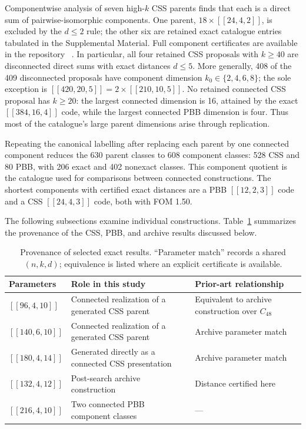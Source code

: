 \documentclass[aps,prx,twocolumn,superscriptaddress,nofootinbib,floatfix]{revtex4-2}
\newcommand{\code}[1]{\ensuremath{\left[\!\left[#1\right]\!\right]}}
\begin{document}
\begingroup
{}
Componentwise analysis of seven high-$k$ CSS parents finds that each is a
direct sum of pairwise-isomorphic components.  One parent,
$18\times\code{24,4,2}$, is excluded by the $d\leq2$ rule; the other six are
retained exact catalogue entries tabulated in the Supplemental Material.  Full
component certificates are available in the repository
~\cite{cruzbenito2026qcode}.  In particular, all
four retained CSS proposals with $k\geq40$ are disconnected direct sums with
exact distances $d\leq5$.  More generally, 408 of the 409 disconnected
proposals have component dimension $k_0\in\{2,4,6,8\}$; the sole exception is
$\code{420,20,5}=2\times\code{210,10,5}$.  No retained connected CSS
proposal has $k\geq20$: the largest connected dimension is 16, attained
by the exact $\code{384,16,4}$ code, while the largest connected PBB dimension
is four.  Thus most of the catalogue's large parent dimensions arise through
replication.
\par
\endgroup

Repeating the canonical labelling after replacing each parent by one
connected component reduces the 630 parent classes to 608 component classes:
528 CSS and 80 PBB, with 206 exact and 402 nonexact classes.  This component
quotient is the catalogue used for comparisons between connected
constructions.  The shortest components with certified exact distances are a
PBB $\code{12,2,3}$ code and a CSS $\code{24,4,3}$ code, both with FOM 1.50.

The following subsections examine individual constructions.
Table~\ref{tab:headline-provenance} summarizes the provenance of the CSS, PBB,
and archive results discussed below.

\begin{table}[t]
\centering
\caption{Provenance of selected exact results.  ``Parameter match'' records a
shared $(n,k,d)$; equivalence is listed where an explicit certificate is
available.}
\label{tab:headline-provenance}
\small
\begin{tabular}{@{}p{}p{}p{}@{}}
\toprule
Parameters & Role in this study & Prior-art relationship\\
\midrule
$\code{96,4,10}$ & Connected realization of a generated CSS parent & Equivalent to archive construction over $C_{48}$\\
$\code{140,6,10}$ & Connected realization of a generated CSS parent & Archive parameter match\\
$\code{180,4,14}$ & Generated directly as a connected CSS presentation & Archive parameter match\\
$\code{132,4,12}$ & Post-search archive construction & Distance certified here\\
$\code{216,4,10}$ & Two connected PBB component classes & ---\\
\bottomrule
\end{tabular}
\end{table}
\end{document}
